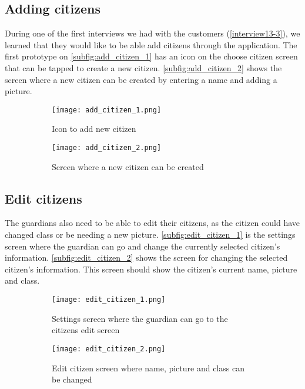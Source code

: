 \subsection{Adding citizens}
During one of the first interviews we had with the customers (\autoref{interview13-3}), we learned that they would like to be able add citizens through the application. 
The first prototype on \autoref{subfig:add_citizen_1} has an icon on the choose citizen screen that can be tapped to create a new citizen.
\autoref{subfig:add_citizen_2} shows the screen where a new citizen can be created by entering a name and adding a picture.
\begin{figure}[H]
    \begin{subfigure}{0.5\textwidth}
    \texttt{[image: add\_citizen\_1.png]}
    \caption{Icon to add new citizen}
    \label{subfig:add_citizen_1}
    \end{subfigure}
    \begin{subfigure}{0.5\textwidth}
        \texttt{[image: add\_citizen\_2.png]}
    \caption{Screen where a new citizen can be created}
    \label{subfig:add_citizen_2}
    \end{subfigure} 
    \caption{}
    \label{fig:add_citizen}
\end{figure}

\subsection{Edit citizens}
The guardians also need to be able to edit their citizens, as the citizen could have changed class or be needing a new picture. 
\autoref{subfig:edit_citizen_1} is the settings screen where the guardian can go and change the currently selected citizen's information. 
\autoref{subfig:edit_citizen_2} shows the screen for changing the selected citizen's information. This screen should show the citizen's current name, picture and class.
\begin{figure}[H]
    \begin{subfigure}{0.5\textwidth}
    \texttt{[image: edit\_citizen\_1.png]}
    \caption{Settings screen where the guardian can go to the citizens edit screen}
    \label{subfig:edit_citizen_1}
    \end{subfigure}
    \begin{subfigure}{0.5\textwidth}
        \texttt{[image: edit\_citizen\_2.png]}
    \caption{Edit citizen screen where name, picture and class can be changed}
    \label{subfig:edit_citizen_2}
    \end{subfigure} 
    \caption{}
    \label{fig:edit_citizen}
\end{figure}

